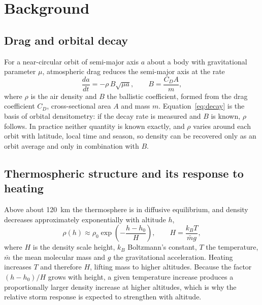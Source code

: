 \documentclass[11pt]{article}
\begin{document}
\section{Background}

\subsection{Drag and orbital decay}
For a near-circular orbit of semi-major axis $a$ about a body with gravitational parameter $\mu$, atmospheric drag reduces the semi-major axis at the rate
\begin{equation}
\frac{da}{dt} = -\rho\, B \sqrt{\mu a}, \qquad B = \frac{C_D A}{m},
\label{eq:decay}
\end{equation}
where $\rho$ is the air density and $B$ the ballistic coefficient, formed from the drag coefficient $C_D$, cross-sectional area $A$ and mass $m$. Equation~\eqref{eq:decay} is the basis of orbital densitometry: if the decay rate is measured and $B$ is known, $\rho$ follows. In practice neither quantity is known exactly, and $\rho$ varies around each orbit with latitude, local time and season, so density can be recovered only as an orbit average and only in combination with $B$.

\subsection{Thermospheric structure and its response to heating}
Above about 120~km the thermosphere is in diffusive equilibrium, and density decreases approximately exponentially with altitude $h$,
\begin{equation}
\rho(h) \approx \rho_0 \exp\!\left(-\frac{h-h_0}{H}\right), \qquad H = \frac{k_B T}{\bar{m} g},
\label{eq:scale}
\end{equation}
where $H$ is the density scale height, $k_B$ Boltzmann's constant, $T$ the temperature, $\bar{m}$ the mean molecular mass and $g$ the gravitational acceleration. Heating increases $T$ and therefore $H$, lifting mass to higher altitudes. Because the factor $(h-h_0)/H$ grows with height, a given temperature increase produces a proportionally larger density increase at higher altitudes, which is why the relative storm response is expected to strengthen with altitude.
\end{document}
